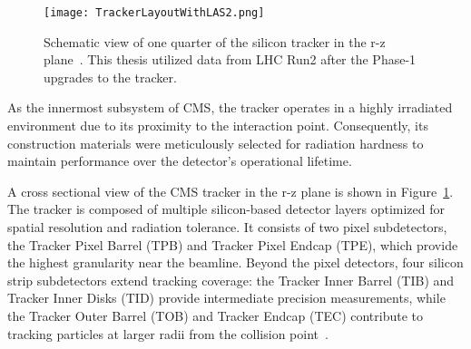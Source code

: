 \begin{figure}[!ht]
    \begin{center}
        \texttt{[image: TrackerLayoutWithLAS2.png]}
        \caption{Schematic view of one quarter of the silicon tracker in the r-z plane~\cite{Adam:2748381}. This thesis utilized data from LHC Run2 after the Phase-1 upgrades to the tracker.}
        \label{fig:silicontracker}
    \end{center}
\end{figure}

As the innermost subsystem of CMS, the tracker operates in a highly irradiated environment due to its proximity to the interaction point. Consequently, its construction materials were meticulously selected for radiation hardness to maintain performance over the detector’s operational lifetime.

A cross sectional view of the CMS tracker in the r-z plane is shown in Figure~\ref{fig:silicontracker}. The tracker is composed of multiple silicon-based detector layers optimized for spatial resolution and radiation tolerance. It consists of two pixel subdetectors, the Tracker Pixel Barrel (TPB) and Tracker Pixel Endcap (TPE), which provide the highest granularity near the beamline. Beyond the pixel detectors, four silicon strip subdetectors extend tracking coverage: the Tracker Inner Barrel (TIB) and Tracker Inner Disks (TID) provide intermediate precision measurements, while the Tracker Outer Barrel (TOB) and Tracker Endcap (TEC) contribute to tracking particles at larger radii from the collision point~\cite{Chatrchyan:1667597}. 



